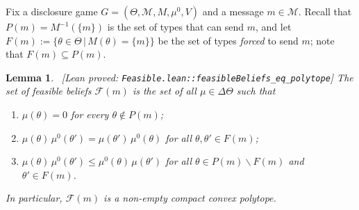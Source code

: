 \documentclass[11pt]{article}
\newtheorem{lemma}{Lemma}
\newcommand{\sep}{\,|\,}
\newcommand{\Msg}{\mathcal{M}}
\newcommand{\leanproved}[1]{{\footnotesize\textsf{\textcolor{green!55!black}{[Lean proved: \texttt{#1}]}}}}
\begin{document}
Fix a disclosure game $G=(\Theta,\Msg,M,\mu^0,V)$ and a message $m\in\Msg$. Recall that $P(m)=M^{-1}(\{m\})$ is the set of types that can send $m$, and let $F(m):=\{\theta\in\Theta\sep M(\theta)=\{m\}\}$ be the set of types \emph{forced} to send $m$; note that $F(m)\subseteq P(m)$.

\begin{lemma}\label{lem:feasible-polytope}\ \leanproved{Feasible.lean::feasibleBeliefs\_eq\_polytope}
    The set of feasible beliefs $\mathcal{F}(m)$ is the set of all $\mu\in\Delta\Theta$ such that
    \begin{enumerate}
        \item[(i)] $\mu(\theta)=0$ for every $\theta\notin P(m)$;
        \item[(ii)] $\mu(\theta)\,\mu^0(\theta')=\mu(\theta')\,\mu^0(\theta)$ for all $\theta,\theta'\in F(m)$;
        \item[(iii)] $\mu(\theta)\,\mu^0(\theta')\leq\mu^0(\theta)\,\mu(\theta')$ for all $\theta\in P(m)\smallsetminus F(m)$ and $\theta'\in F(m)$.
    \end{enumerate}
    In particular, $\mathcal{F}(m)$ is a non-empty compact convex polytope.
\end{lemma}
\end{document}
